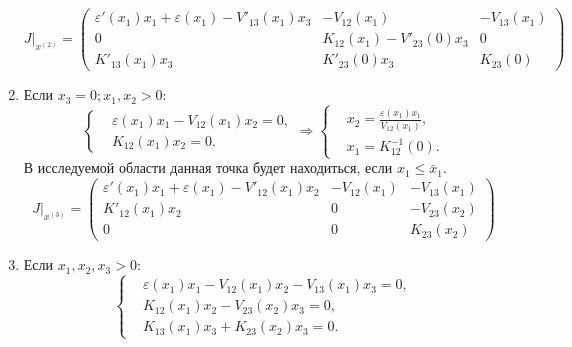 \begin{enumerate}
            \[
                J \big|_{x^{(2)}} = \left(
                    \begin{matrix}
                        \varepsilon'(x_1) x_1 + \varepsilon(x_1) - V'_{13} (x_1) x_3 & -V_{12} (x_1) & -V_{13} (x_1) \\
                        0 & K_{12}(x_1) - V'_{23} (0) x_3 & 0 \\
                        K'_{13} (x_1) x_3 & K'_{23} (0) x_3 & K_{23} (0)
                    \end{matrix}
                \right)
            \]
        \item Если \( x_3 = 0; x_1, x_2 > 0 \):
            \[
                \left\{\begin{split}
                    & \varepsilon(x_1)x_1 - V_{12}(x_1)x_2 = 0, \\
                    & K_{12}(x_1)x_2 = 0. 
                \end{split}\right.
                \Rightarrow
                \left\{\begin{split}
                    & x_2 = \frac{ \varepsilon(x_1)x_1 }{ V_{12}(x_1) }, \\
                    & x_1 = K^{-1}_{12}( 0 ). 
                \end{split}\right.
            \]
            В исследуемой области данная точка будет находиться, если \( x_1 \leq \bar{x}_1 \).
            \[
                J\big|_{x^{(3)}} = \left(
                    \begin{matrix}
                        \varepsilon'(x_1) x_1 + \varepsilon(x_1) - V'_{12}(x_1) x_2 & -V_{12} (x_1) & -V_{13} (x_1) \\
                        K'_{12} (x_1) x_2 & 0 & -V_{23}(x_2) \\
                        0 & 0 & K_{23} (x_2)
                    \end{matrix}
                \right)
            \]
        \item Если \( x_1, x_2, x_3 > 0 \):
            \[
                \left\{\begin{split}
                    & \varepsilon(x_1)x_1 - V_{12}(x_1)x_2 - V_{13}(x_1)x_3 = 0, \\
                    & K_{12}(x_1)x_2 - V_{23}(x_2)x_3 = 0, \\
                    & K_{13}(x_1)x_3 + K_{23}(x_2)x_3 = 0. 
                \end{split}\right.
            \]

    \end{enumerate}